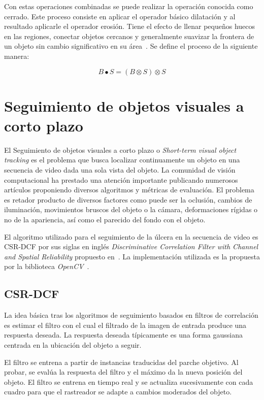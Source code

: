 Con estas operaciones combinadas se puede realizar la operación conocida como cerrado. Este proceso consiste en aplicar el operador básico dilatación y al resultado aplicarle el operador erosión. Tiene el efecto de llenar pequeños huecos en las regiones, conectar objetos cercanos y generalmente suavizar la frontera de un objeto sin cambio significativo en su área~\cite{castleman1996digital}. Se define el proceso de la siguiente manera:

\begin{equation}
	B \bullet S = (B \otimes S) \otimes S
\end{equation}

\section{Seguimiento de objetos visuales a corto plazo}\label{section:tracking}

El Seguimiento de objetos visuales a corto plazo o \textit{Short-term visual object tracking} es el problema  que busca localizar continuamente un objeto en una secuencia de video dada una sola vista del objeto. La comunidad de visión computacional ha prestado una atención importante publicando numerosos artículos proponiendo diversos algoritmos y métricas de evaluación. El problema es retador producto de diversos factores como puede ser la oclusión, cambios de iluminación, movimientos bruscos del objeto o la cámara, deformaciones rígidas o no de la apariencia, así como el parecido del fondo con el objeto.	

El algoritmo utilizado para el seguimiento de la úlcera en la secuencia de video es CSR-DCF por sus siglas en inglés \textit{Discriminative Correlation Filter with Channel and Spatial Reliability} propuesto en~\cite{lunevzivc2018discriminative}. La implementación utilizada es la propuesta por la biblioteca \textit{OpenCV}~\cite{bradski2000opencv}.

\subsection{CSR-DCF}

La idea básica tras los algoritmos de seguimiento basados en filtros de correlación es estimar el filtro con el cual el filtrado de la imagen de entrada produce una respuesta deseada. La respuesta deseada típicamente es una forma gaussiana centrada en la ubicación del objeto a seguir.

El filtro se entrena a partir de instancias traducidas del parche objetivo. Al probar, se evalúa la respuesta del filtro y el máximo da la nueva posición del objeto. El filtro se entrena en tiempo real y se actualiza sucesivamente con cada cuadro para que el rastreador se adapte a cambios moderados del objeto.

